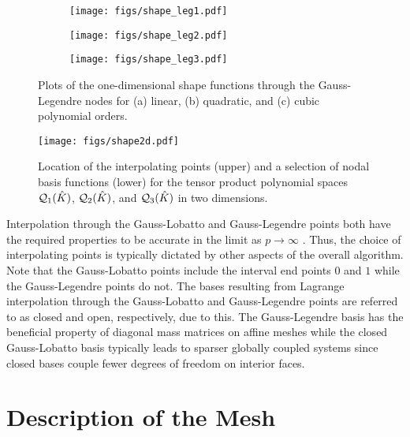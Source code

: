 \documentclass[../doc.tex]{subfiles}
\begin{document}
\begin{figure}
\centering
\begin{subfigure}{.30\textwidth}
	\centering
	\texttt{[image: figs/shape\_leg1.pdf]}
	\caption{}
\end{subfigure}
\begin{subfigure}{.30\textwidth}
	\centering
	\texttt{[image: figs/shape\_leg2.pdf]}
	\caption{}
\end{subfigure}
\begin{subfigure}{.30\textwidth}
	\centering
	\texttt{[image: figs/shape\_leg3.pdf]}
	\caption{}
\end{subfigure}
\caption{Plots of the one-dimensional shape functions through the Gauss-Legendre nodes for (a) linear, (b) quadratic, and (c) cubic polynomial orders.}
\label{fem:shape_leg1d}
\end{figure}

\begin{figure}
\centering
\texttt{[image: figs/shape2d.pdf]}
\caption{Location of the interpolating points (upper) and a selection of nodal basis functions (lower) for the tensor product polynomial spaces $\mathcal{Q}_{1}(\hat{K})$, $\mathcal{Q}_{2}(\hat{K})$, and $\mathcal{Q}_{3}(\hat{K})$ in two dimensions.}
\label{fem:shape2d}
\end{figure}

Interpolation through the Gauss-Lobatto and Gauss-Legendre points both have the required properties to be accurate in the limit as $p\rightarrow \infty$ \cite{spectral_canuto,trefethen}. Thus, the choice of interpolating points is typically dictated by other aspects of the overall algorithm. Note that the Gauss-Lobatto points include the interval end points $0$ and $1$ while the Gauss-Legendre points do not. The bases resulting from Lagrange interpolation through the Gauss-Lobatto and Gauss-Legendre points are referred to as closed and open, respectively, due to this. The Gauss-Legendre basis has the beneficial property of diagonal mass matrices on affine meshes while the closed Gauss-Lobatto basis typically leads to sparser globally coupled systems since closed bases couple fewer degrees of freedom on interior faces. 

\section{Description of the Mesh}
\end{document}
